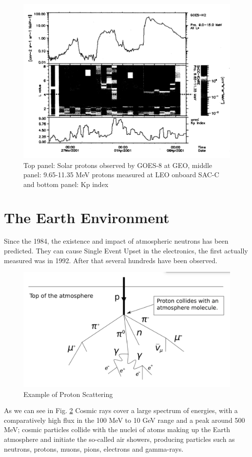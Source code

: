 \documentclass[./dissertation.tex]{subfiles}
\begin{document}
\begin{figure}[h!]
\centering
  \includegraphics[scale = 0.50]{imgs/radbelt10.png}
  \caption{Top panel: Solar protons observed by GOES-8 at GEO, middle panel: 9.65-11.35 MeV protons measured at LEO onboard SAC-C and bottom panel: Kp index \cite{bib2}}
  \label{fig:radbel10}
\end{figure}

\fi

\newpage
\section{The Earth Environment}
Since the 1984, the existence and impact of atmospheric neutrons has been predicted. They can cause Single Event Upset in the electronics, the first actually measured was in 1992. After that several hundreds have been observed.
\begin{figure}[h!]
\centering
  \includegraphics[scale = 0.50]{imgs/neutrons.png}
  \caption{Example of Proton Scattering \cite{bib1}}
  \label{fig:earthenv}
\end{figure}
As we can see in Fig. \ref{fig:earthenv} Cosmic rays cover a large spectrum of energies, with a comparatively high flux in the 100 MeV to 10 GeV range and a peak around 500 MeV; cosmic particles collide with the nuclei of atoms making up the Earth atmosphere and initiate the so-called air showers, producing particles such as neutrons, protons, muons, pions, electrons and gamma-rays.
\end{document}
